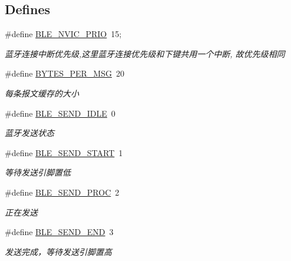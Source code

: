 \subsection*{\-Defines}
\begin{DoxyCompactItemize}
\item 
\hypertarget{group___b_l_e_gaa5ebd183ec26cf40bb11aa48a6b51349}{\#define \hyperlink{group___b_l_e_gaa5ebd183ec26cf40bb11aa48a6b51349}{\-B\-L\-E\-\_\-\-N\-V\-I\-C\-\_\-\-P\-R\-I\-O}~15;}\label{group___b_l_e_gaa5ebd183ec26cf40bb11aa48a6b51349}

\begin{DoxyCompactList}\small\item\em 蓝牙连接中断优先级,这里蓝牙连接优先级和下键共用一个中断, 故优先级相同 \end{DoxyCompactList}\item 
\hypertarget{group___b_l_e_ga404ec81438167db1999e16f77f79760d}{\#define \hyperlink{group___b_l_e_ga404ec81438167db1999e16f77f79760d}{\-B\-Y\-T\-E\-S\-\_\-\-P\-E\-R\-\_\-\-M\-S\-G}~20}\label{group___b_l_e_ga404ec81438167db1999e16f77f79760d}

\begin{DoxyCompactList}\small\item\em 每条报文缓存的大小 \end{DoxyCompactList}\item 
\#define \hyperlink{group___b_l_e_gaf5f8c77ba9a9819251362bc1d7f5f045}{\-B\-L\-E\-\_\-\-S\-E\-N\-D\-\_\-\-I\-D\-L\-E}~0
\begin{DoxyCompactList}\small\item\em 蓝牙发送状态 \end{DoxyCompactList}\item 
\hypertarget{group___b_l_e_gaff49a99d98227ed29cbb3f2776daded9}{\#define \hyperlink{group___b_l_e_gaff49a99d98227ed29cbb3f2776daded9}{\-B\-L\-E\-\_\-\-S\-E\-N\-D\-\_\-\-S\-T\-A\-R\-T}~1}\label{group___b_l_e_gaff49a99d98227ed29cbb3f2776daded9}

\begin{DoxyCompactList}\small\item\em 等待发送引脚置低 \end{DoxyCompactList}\item 
\hypertarget{group___b_l_e_ga18ddb70766e02bd63fe66869f9988fca}{\#define \hyperlink{group___b_l_e_ga18ddb70766e02bd63fe66869f9988fca}{\-B\-L\-E\-\_\-\-S\-E\-N\-D\-\_\-\-P\-R\-O\-C}~2}\label{group___b_l_e_ga18ddb70766e02bd63fe66869f9988fca}

\begin{DoxyCompactList}\small\item\em 正在发送 \end{DoxyCompactList}\item 
\hypertarget{group___b_l_e_gab8a7913edcd2e4a7616a5362354e7824}{\#define \hyperlink{group___b_l_e_gab8a7913edcd2e4a7616a5362354e7824}{\-B\-L\-E\-\_\-\-S\-E\-N\-D\-\_\-\-E\-N\-D}~3}\label{group___b_l_e_gab8a7913edcd2e4a7616a5362354e7824}

\begin{DoxyCompactList}\small\item\em 发送完成，等待发送引脚置高 \end{DoxyCompactList}\end{DoxyCompactItemize}

